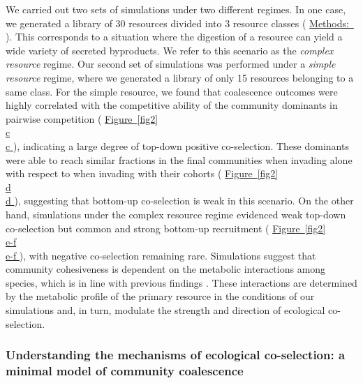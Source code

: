 \documentclass[a4paper,10pt]{article}
\newcommand{\figref}[2][]{%
  \hyperref[{#2}]{%
    Figure~\ref*{#2}%
    \ifx\\#1\\%
    \else
      #1%
    \fi
  }%
}
\newcommand{\methodsref}[1]{%
  \hyperref[{methods:#1}]{%
   Methods:~\nameref*{methods:#1}%
  }%
}
\begin{document}
We carried out two sets of simulations under two different regimes.
In one case, we generated a library of 30 resources divided into 3 resource classes
(\methodsref{sim}). This corresponds to a situation where the digestion of a resource
can yield a wide variety of secreted byproducts.
We refer to this scenario as the \textit{complex resource} regime.
Our second set of simulations was performed under a \textit{simple resource} regime, where we
generated a library of only 15 resources belonging to a same class.
For the simple resource, we found that coalescence outcomes were highly correlated with
the competitive ability of the community dominants in pairwise competition
(\figref[c]{fig2}),
indicating a large degree of top-down positive co-selection.
These dominants were able to reach similar fractions in the final communities when invading alone
with respect to when invading with their cohorts
(\figref[d]{fig2}),
suggesting that bottom-up co-selection is weak in this scenario.
On the other hand,
simulations under the complex resource regime evidenced weak top-down co-selection but 
common and strong bottom-up recruitment (\figref[e-f]{fig2}), with negative co-selection remaining rare.
Simulations suggest that community cohesiveness is dependent on the metabolic interactions among species,
which is in line with previous findings \cite{Goldford2018, Estrela2020}.
These interactions are determined by the metabolic profile of the primary resource in the conditions
of our simulations and, in turn, modulate the strength and direction of ecological co-selection.
\fi

\subsubsection*{Understanding the mechanisms of ecological co-selection: a minimal model of community coalescence}
\end{document}
